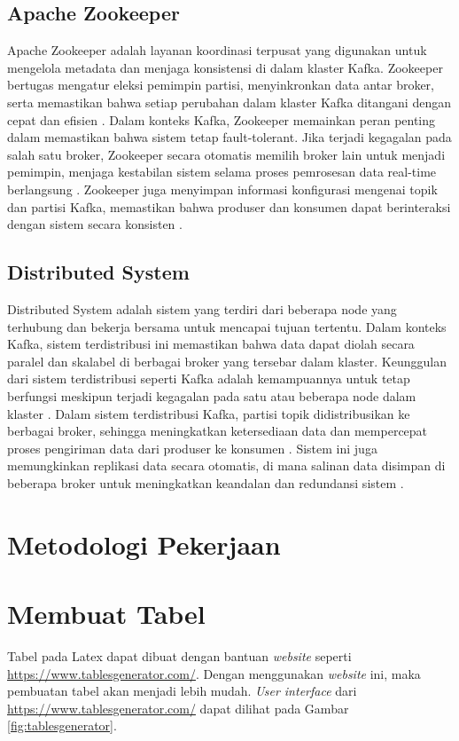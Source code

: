 \subsection{Apache Zookeeper}

Apache Zookeeper adalah layanan koordinasi terpusat yang digunakan untuk mengelola metadata dan menjaga konsistensi di dalam klaster Kafka. Zookeeper bertugas mengatur eleksi pemimpin partisi, menyinkronkan data antar broker, serta memastikan bahwa setiap perubahan dalam klaster Kafka ditangani dengan cepat dan efisien \citep{comp:zookeeper}. Dalam konteks Kafka, Zookeeper memainkan peran penting dalam memastikan bahwa sistem tetap fault-tolerant. Jika terjadi kegagalan pada salah satu broker, Zookeeper secara otomatis memilih broker lain untuk menjadi pemimpin, menjaga kestabilan sistem selama proses pemrosesan data real-time berlangsung \citep{comp:zookeeper}. Zookeeper juga menyimpan informasi konfigurasi mengenai topik dan partisi Kafka, memastikan bahwa produser dan konsumen dapat berinteraksi dengan sistem secara konsisten \citep{comp:zookeeper}.

\subsection{Distributed System}

Distributed System adalah sistem yang terdiri dari beberapa node yang terhubung dan bekerja bersama untuk mencapai tujuan tertentu. Dalam konteks Kafka, sistem terdistribusi ini memastikan bahwa data dapat diolah secara paralel dan skalabel di berbagai broker yang tersebar dalam klaster. Keunggulan dari sistem terdistribusi seperti Kafka adalah kemampuannya untuk tetap berfungsi meskipun terjadi kegagalan pada satu atau beberapa node dalam klaster \citep{ieee:distributed}. Dalam sistem terdistribusi Kafka, partisi topik didistribusikan ke berbagai broker, sehingga meningkatkan ketersediaan data dan mempercepat proses pengiriman data dari produser ke konsumen \citep{ieee:distributed}. Sistem ini juga memungkinkan replikasi data secara otomatis, di mana salinan data disimpan di beberapa broker untuk meningkatkan keandalan dan redundansi sistem \citep{ieee:distributed}.

\section{Metodologi Pekerjaan}



\section{Membuat Tabel}
\label{sec:latexTable}
Tabel pada Latex dapat dibuat dengan bantuan \textit{website} seperti \url{https://www.tablesgenerator.com/}.
Dengan menggunakan \textit{website} ini, maka pembuatan tabel akan menjadi lebih mudah.
\textit{User interface} dari \url{https://www.tablesgenerator.com/} dapat dilihat pada Gambar \ref{fig:tablesgenerator}.

